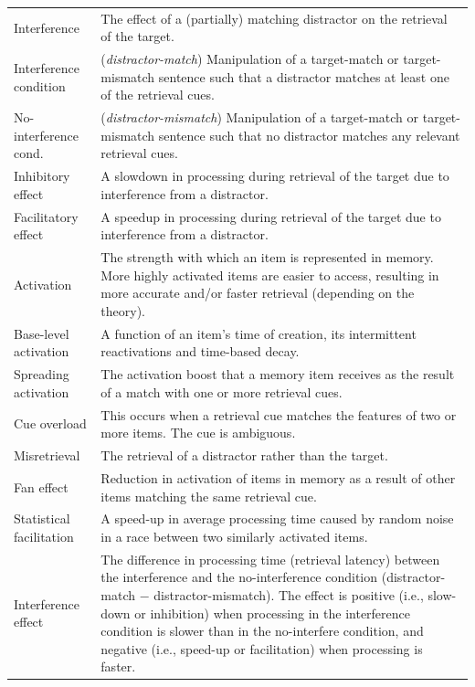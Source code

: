 \documentclass{cambridge7A}\usepackage[]{graphicx}\usepackage[]{color}
\begin{document}
\begin{subappendices}
\begin{table}[!htbp]
\begin{center}
{\begin{tabular}{p{4cm}p{6cm}}
Interference        & The effect of a (partially) matching distractor on the retrieval of the target. \\
Interference condition     & (\emph{distractor-match}) Manipulation of a target-match or target-mismatch sentence such that a distractor matches at least one of the retrieval cues. \\
No-interference cond.     & (\emph{distractor-mismatch}) Manipulation of a target-match or target-mismatch sentence such that no distractor matches any relevant retrieval cues. \\
Inhibitory effect   & A slowdown in processing during retrieval of the target due to interference from a distractor. \\
Facilitatory effect & A speedup in processing during retrieval of the target due to interference from a distractor. \\
Activation          & The strength with which an item is represented in memory. More highly activated items are easier to access, resulting in more accurate and/or faster retrieval (depending on the theory). \\
Base-level activation & A function of an item's time of creation, its intermittent reactivations and time-based decay. \\
Spreading activation & The activation boost that a memory item receives as the result of a match with one or more retrieval cues. \\
Cue overload        & This occurs when a retrieval cue matches the features of two or more items. The cue is ambiguous. \\
Misretrieval        & The retrieval of a distractor rather than the target. \\
Fan effect          & Reduction in activation of items in memory as a result of other items matching the same retrieval cue. \\
Statistical facilitation & A speed-up in average processing time caused by random noise in a race between two similarly activated items. \\
Interference effect  & The difference in processing time (retrieval latency) between the interference and the no-interference condition (distractor-match $-$ distractor-mismatch). The effect is positive (i.e., slow-down or inhibition) when processing in the interference condition is slower than in the no-interfere condition, and negative (i.e., speed-up or facilitation) when processing is faster. \\
\hline
\end{tabular}
}
\end{center}
\end{table}





\end{subappendices}
\end{document}
